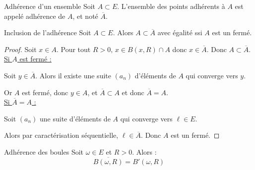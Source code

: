 \begin{definition}{Adhérence d'un ensemble}{}
    Soit $A \subset E$. 
    L'ensemble des points adhérents à $A$ est appelé adhérence de $A$, et noté 
    $\overline A$.
\end{definition}

\begin{proposition}{Inclusion de l'adhérence}{}
    Soit $A \subset E$. Alors $A \subset \overline A$ avec égalité ssi $A$ est un fermé.
\end{proposition}

\begin{proof}
    Soit $x \in A$. Pour tout $R > 0, \, x \in B(x, R) \cap A$ donc $x \in \overline A$.
    Donc $A \subset \overline A$. \\

    \uline{Si $A$ est fermé :} 

    Soit $y \in \overline A$. Alors il existe une suite $(a_n)$ d'éléments
    de $A$ qui converge vers $y$.

    Or $A$ est fermé, donc $y \in A$, et $\overline A \subset A$ et donc $\overline A = A$. \\

    \uline{Si $\overline A = A$ : }

    \svspace Soit $(a_n)$ une suite d'éléments de $A$ qui converge vers $\ell \in E$.

    Alors par caractérisation séquentielle, $\ell \in \overline A$. Donc $A$ est un fermé. 
\end{proof}

\begin{proposition}{Adhérence des boules}{}
    Soit $\omega \in E$ et $R > 0$. Alors :
     \[\overline{B(\omega, R)} = B'(\omega, R)\]
\end{proposition}

